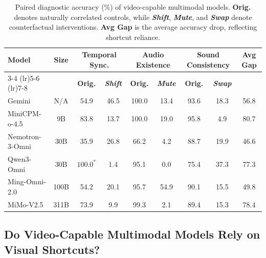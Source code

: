 \documentclass{llmxive}
\providecommand{\shift}{\textbf{\textit{Shift}}\xspace}
\providecommand{\mute}{\textbf{\textit{Mute}}\xspace}
\providecommand{\swap}{\textbf{\textit{Swap}}\xspace}
\begin{document}
\begin{table}[t]
\centering
\small
\begin{tabular}{lcccccccc}
\toprule
\multirow{2}{*}{\textbf{Model}}
& \multirow{2}{*}{\textbf{Size}}
& \multicolumn{2}{c}{\textbf{Temporal Sync.}}
& \multicolumn{2}{c}{\textbf{Audio Existence}}
& \multicolumn{2}{c}{\textbf{Sound Consistency}}
& \multirow{2}{*}{\textbf{Avg Gap}} \\
\cmidrule(lr){3-4} \cmidrule(lr){5-6} \cmidrule(lr){7-8}
&
& \textbf{Orig.} & \cellcolor{shiftbg}\textbf{\shift}
& \textbf{Orig.} & \cellcolor{mutebg}\textbf{\mute}
& \textbf{Orig.} & \cellcolor{swapbg}\textbf{\swap}
&  \\
\midrule
Gemini              & N/A  & 54.9        & \cellcolor{shiftbg}46.5 & 100.0 & \cellcolor{mutebg}13.4 & 93.6 & \cellcolor{swapbg}18.3 & \cellcolor{gapbg}56.8 \\
MiniCPM-o-4.5       & 9B   & 83.8        & \cellcolor{shiftbg}13.7 & 100.0 & \cellcolor{mutebg}19.0 & 95.8 & \cellcolor{swapbg}4.9  & \cellcolor{gapbg}80.7 \\
Nemotron-3-Omni     & 30B  & 35.9        & \cellcolor{shiftbg}26.8 & 66.2  & \cellcolor{mutebg}4.2  & 88.7 & \cellcolor{swapbg}19.9 & \cellcolor{gapbg}46.6 \\
Qwen3-Omni          & 30B  & $100.0^{*}$ & \cellcolor{shiftbg}1.4  & 95.1  & \cellcolor{mutebg}0.0  & 75.4 & \cellcolor{swapbg}37.3 & \cellcolor{gapbg}77.3 \\
Ming-Omni-2.0       & 100B & 54.2        & \cellcolor{shiftbg}20.1 & 95.7  & \cellcolor{mutebg}54.9 & 90.1 & \cellcolor{swapbg}15.5 & \cellcolor{gapbg}49.8 \\
MiMo-V2.5           & 311B & 73.9        & \cellcolor{shiftbg}9.9  & 99.3  & \cellcolor{mutebg}2.1  & 89.4 & \cellcolor{swapbg}15.3 & \cellcolor{gapbg}78.4 \\
\bottomrule
\end{tabular}
\vspace{-0.3cm}
\caption{
Paired diagnostic accuracy (\%) of video-capable multimodal models.
\textbf{Orig.} denotes naturally correlated controls, while \shift, \mute, and \swap denote counterfactual interventions.
\textbf{Avg Gap} is the average accuracy drop, reflecting shortcut reliance.
}
\label{tab:shortcut_diagnosis}
\end{table}


\subsection{Do Video-Capable Multimodal Models Rely on Visual Shortcuts?}
\label{sec:shortcut_diagnosis}
\end{document}
